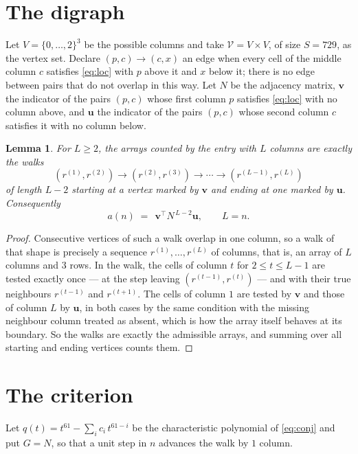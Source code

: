 \documentclass[11pt,a4paper]{article}
\theoremstyle{plain}
\newtheorem{lemma}[theorem]{Lemma}
\theoremstyle{definition}
\begin{document}
\section{The digraph}

Let $V=\{0,\dots,2\}^{3}$ be the possible columns and take
$\mathcal V=V\times V$, of size $S=729$, as the vertex set. Declare $(p,c)\to(c,x)$ an edge
when every cell of the middle column $c$ satisfies \eqref{eq:loc} with $p$ above it and $x$
below it; there is no edge between pairs that do not overlap in this way. Let $N$ be the
adjacency matrix, $\mathbf{v}$ the indicator of the pairs $(p,c)$ whose first column $p$
satisfies \eqref{eq:loc} with no column above, and $\mathbf{u}$ the indicator of
the pairs $(p,c)$ whose second column $c$ satisfies it with no column below.

\begin{lemma}\label{lem:walk}
For $L\ge2$, the arrays counted by the entry with $L$ columns are exactly the walks
\[
(r^{(1)},r^{(2)})\to(r^{(2)},r^{(3)})\to\cdots\to(r^{(L-1)},r^{(L)})
\]
of length $L-2$ starting at a vertex marked by $\mathbf{v}$ and ending at one marked by
$\mathbf{u}$. Consequently
\[
a(n)\;=\;\,\mathbf{v}^{\!\top}N^{\,L-2}\mathbf{u},\qquad L=n .
\]
\end{lemma}

\begin{proof}
Consecutive vertices of such a walk overlap in one column, so a walk of that shape is
precisely a sequence $r^{(1)},\dots,r^{(L)}$ of columns, that is, an array of $L$ columns
and $3$ rows. In the walk, the cells of column $t$ for $2\le t\le L-1$ are tested
exactly once --- at the step leaving $(r^{(t-1)},r^{(t)})$ --- and with their true
neighbours $r^{(t-1)}$ and $r^{(t+1)}$. The cells of column $1$ are tested by
$\mathbf{v}$ and those of column $L$ by $\mathbf{u}$, in both cases by the same condition
with the missing neighbour column treated as absent, which is how the array itself behaves at
its boundary. So the walks are exactly the admissible arrays, and summing over all starting
and ending vertices counts them.
\end{proof}

\section{The criterion}

Let $q(t)=t^{61}-\sum_i c_i\,t^{61-i}$ be the characteristic polynomial of
\eqref{eq:conj} and put $G=N$, so that a unit step in $n$ advances the walk by
$1$ column.
\end{document}

